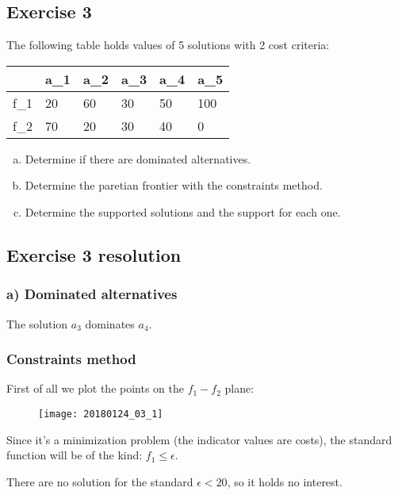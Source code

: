 \documentclass[\main/main.tex]{subfiles}
\begin{document}
\subsection{Exercise 3}
The following table holds values of 5 solutions with 2 cost criteria:
\begin{table}
  \begin{tabular}{L|LLLLL}
        & a_1 & a_2 & a_3 & a_4 & a_5 \\
    \hline
    f_1 & 20  & 60  & 30  & 50  & 100 \\
    f_2 & 70  & 20  & 30  & 40  & 0
  \end{tabular}
\end{table}

\begin{enumerate}[a)]
  \item Determine if there are dominated alternatives.
  \item Determine the paretian frontier with the constraints method.
  \item Determine the supported solutions and the support for each one.
\end{enumerate}

\subsection{Exercise 3 resolution}
\subsubsection*{a) Dominated alternatives}
The solution $a_3$ dominates $a_4$.

\subsubsection*{Constraints method}
First of all we plot the points on the $f_1-f_2$ plane:

\begin{figure}
  \texttt{[image: 20180124\_03\_1]}
\end{figure}

Since it's a minimization problem (the indicator values are costs), the standard function will be of the kind: $f_1 \leq \epsilon$.

There are no solution for the standard $\epsilon < 20$, so it holds no interest.
\end{document}
